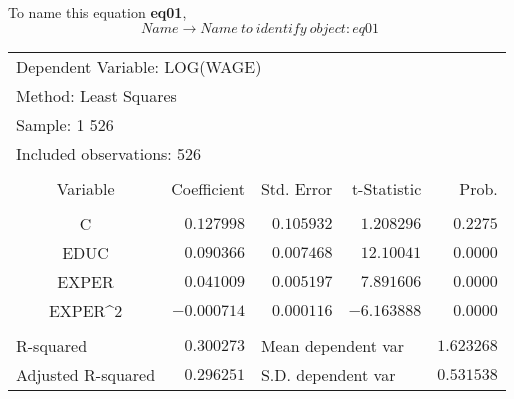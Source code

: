 \documentclass[12pt]{report}
\begin{document}
\noindent To name this equation \textbf{eq01},
$$Name \to Name\ to\ identify\ object: eq01$$
\begin{figure}[H]
	\centering
\end{figure}
\vspace{-\baselineskip}
\begin{figure}[H]
	\centering
\end{figure}
\vspace{-\baselineskip}
\begin{table}[H]
	\centering
	\begin{tabular}{lrrrr}
		\multicolumn{4}{l}{Dependent Variable: LOG(WAGE)}&\multicolumn{1}{c}{}\\
		\multicolumn{3}{l}{Method: Least Squares}&\multicolumn{1}{c}{}&\multicolumn{1}{c}{}\\
		\multicolumn{2}{l}{Sample: 1 526}&\multicolumn{1}{c}{}&\multicolumn{1}{c}{}&\multicolumn{1}{c}{}\\
		\multicolumn{3}{l}{Included observations: 526}&\multicolumn{1}{c}{}&\multicolumn{1}{c}{}\\
		[4.5pt] \hline \\ [-4.5pt]
		\multicolumn{1}{c}{Variable}&\multicolumn{1}{r}{Coefficient}&\multicolumn{1}{r}{Std. Error}&\multicolumn{1}{r}{t-Statistic}&\multicolumn{1}{r}{Prob.}\\
		[4.5pt] \hline \\ [-4.5pt]
		\multicolumn{1}{c}{C}&\multicolumn{1}{r}{$0.127998$}&\multicolumn{1}{r}{$0.105932$}&\multicolumn{1}{r}{$1.208296$}&\multicolumn{1}{r}{$0.2275$}\\
		\multicolumn{1}{c}{EDUC}&\multicolumn{1}{r}{$0.090366$}&\multicolumn{1}{r}{$0.007468$}&\multicolumn{1}{r}{$12.10041$}&\multicolumn{1}{r}{$0.0000$}\\
		\multicolumn{1}{c}{EXPER}&\multicolumn{1}{r}{$0.041009$}&\multicolumn{1}{r}{$0.005197$}&\multicolumn{1}{r}{$7.891606$}&\multicolumn{1}{r}{$0.0000$}\\
		\multicolumn{1}{c}{EXPER\textasciicircum 2}&\multicolumn{1}{r}{$-0.000714$}&\multicolumn{1}{r}{$0.000116$}&\multicolumn{1}{r}{$-6.163888$}&\multicolumn{1}{r}{$0.0000$}\\
		[4.5pt] \hline \\ [-4.5pt]
		\multicolumn{1}{l}{R-squared}&\multicolumn{1}{r}{$0.300273$}&\multicolumn{2}{l}{Mean dependent var}&\multicolumn{1}{r}{$1.623268$}\\
		\multicolumn{1}{l}{Adjusted R-squared}&\multicolumn{1}{r}{$0.296251$}&\multicolumn{2}{l}{S.D. dependent var}&\multicolumn{1}{r}{$0.531538$}\\

\end{tabular}
\end{table}
\end{document}
